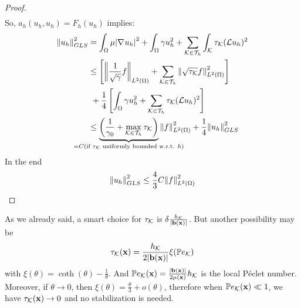 \begin{proof}
\begin{equation*}
\begin{split}
        \end{split}
    \end{equation*}
    So, \(a_h(u_h, u_h) = F_h(u_h)\) implies:
    \begin{align*}
        \norm{u_h}_{GLS}^2 &= \int_\Omega \mu \abs{\grad u_h}^2 + \int_\Omega \gamma u_h^2 + \sum_{\element \in \triangulation} \int_\element \tau_\element (\mathcal{L}u_h)^2 \\
        &\leq \left[ \norm{\frac{1}{\sqrt{\gamma}}f}_{L^2(\Omega)} + \sum_{\element \in \triangulation} \norm{\sqrt{\tau_\element}f}_{L^2(\Omega)}^2 \right] \\
        & \ + \frac{1}{4} \left[ \int_\Omega \gamma u_h^2 + \sum_{\element \in \triangulation} \tau_\element (\mathcal{L}u_h)^2 \right] \\
        &\leq \underbrace{\left( \frac{1}{\gamma_0} +\max_{\element \in \triangulation} \tau_\element \right)}_{\mathclap{=C(\txt{if }\tau_\element \txt{ uniformly bounded w.r.t. }h)}} \ltwonorm{f}^2 +\frac{1}{4} \norm{u_h}_{GLS}^2
    \end{align*}
    In the end 
    \[
        \norm{u_h}_{GLS}^2 \leq \frac{4}{3} C \norm{f}_{L^2(\Omega)}^2
    \]
\end{proof}
As we already said, a smart choice for \(\tau_{\mathcal{K}}\) is \(\delta\frac{h_{\mathcal{K}}}{\abs{\textbf{b}(\textbf{x})}}\). But another possibility may be 
\[
    \tau_{\mathcal{K}}(\textbf{x}) = \frac{h_{\mathcal{K}}}{2\abs{\textbf{b}(\textbf{x})}} \xi(\mathbb{P}e_{\mathcal{K}})
\]
with \(\xi(\theta) = \coth(\theta)-\frac{1}{\theta}\). And \(\mathbb{P}e_{\mathcal{K}} (\textbf{x}) = \frac{\abs{\textbf{b}(\textbf{x})}}{2\mu(\textbf{x})}h_{\mathcal{K}}\) is the local Péclet number. 
Moreover, if \(\theta \to 0\), then \(\xi(\theta) = \frac{\theta}{3} + o(\theta)\), therefore when \(\mathbb{P}e_{\mathcal{K}}(\textbf{x}) \ll 1\), we have \(\tau_{\mathcal{K}}(\textbf{x}) \to 0\) and no stabilization is needed.
